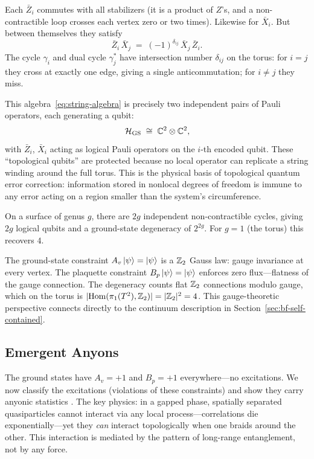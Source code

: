 Each $\bar{Z}_i$ commutes with all stabilizers (it is a product of $Z$'s, and a non-contractible loop crosses each vertex zero or two times).  Likewise for $\bar{X}_i$.  But between themselves they satisfy
\begin{equation}\label{eq:string-algebra}
    \bar{Z}_i \,\bar{X}_j \;=\; (-1)^{\delta_{ij}}\, \bar{X}_j \,\bar{Z}_i.
\end{equation}
The cycle $\gamma_i$ and dual cycle $\gamma_j^*$ have intersection number $\delta_{ij}$ on the torus: for $i = j$ they cross at exactly one edge, giving a single anticommutation; for $i \neq j$ they miss.

This algebra~\eqref{eq:string-algebra} is precisely two independent pairs of Pauli operators, each generating a qubit:
\begin{equation}\label{eq:gs-qubit-decomp}
    \mathcal{H}_{\mathrm{GS}} \;\cong\; \mathbb{C}^2 \otimes \mathbb{C}^2,
\end{equation}
with $\bar{Z}_i$, $\bar{X}_i$ acting as logical Pauli operators on the $i$-th encoded qubit.  These ``topological qubits'' are protected because no local operator can replicate a string winding around the full torus.  This is the physical basis of topological quantum error correction: information stored in nonlocal degrees of freedom is immune to any error acting on a region smaller than the system's circumference.

\begin{remark}\label{rmk:genus-g}
On a surface of genus $g$, there are $2g$ independent non-contractible cycles, giving $2g$ logical qubits and a ground-state degeneracy of $2^{2g}$.  For $g = 1$ (the torus) this recovers $4$.
\end{remark}

The ground-state constraint $A_v \left|\psi\right\rangle = \left|\psi\right\rangle$ is a $\mathbb{Z}_2$ Gauss law: gauge invariance at every vertex.  The plaquette constraint $B_p \left|\psi\right\rangle = \left|\psi\right\rangle$ enforces zero flux---flatness of the gauge connection.  The degeneracy counts flat $\mathbb{Z}_2$ connections modulo gauge, which on the torus is $|\mathrm{Hom}(\pi_1(T^2), \mathbb{Z}_2)| = |\mathbb{Z}_2|^2 = 4$.  This gauge-theoretic perspective connects directly to the continuum description in Section~\ref{sec:bf-self-contained}.

\subsection{Emergent Anyons}
\label{subsec:emergent-anyons}

The ground states have $A_v = +1$ and $B_p = +1$ everywhere---no excitations.  We now classify the excitations (violations of these constraints) and show they carry anyonic statistics \cite{Kitaev2003FaultTolerant}.  The key physics: in a gapped phase, spatially separated quasiparticles cannot interact via any local process---correlations die exponentially---yet they \emph{can} interact topologically when one braids around the other.  This interaction is mediated by the pattern of long-range entanglement, not by any force.

